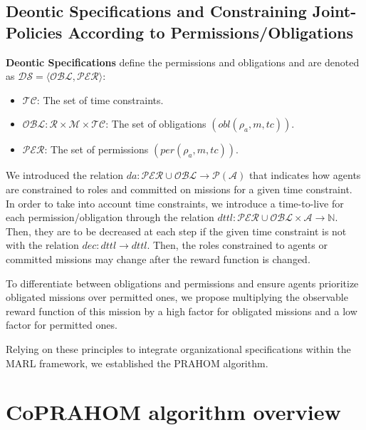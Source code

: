 \documentclass[conference]{IEEEtran}
\newcounter{relation}
\begin{document}
\subsection{Deontic Specifications and Constraining Joint-Policies According to Permissions/Obligations}

\textbf{Deontic Specifications} define the permissions and obligations and are denoted as $\mathcal{DS} = \langle \mathcal{OBL}, \mathcal{PER} \rangle$:

\begin{itemize}
    \item $\mathcal{TC}$: The set of time constraints.
    \item $\mathcal{OBL}: \mathcal{R} \times \mathcal{M} \times \mathcal{TC}$: The set of obligations $(obl(\rho_a, m, tc))$.
    \item $\mathcal{PER}$: The set of permissions $(per(\rho_a, m, tc))$.
\end{itemize}

We introduced the relation $da: \mathcal{PER} \cup \mathcal{OBL} \rightarrow \mathcal{P}(\mathcal{A})$ that indicates how agents are constrained to roles and committed on missions for a given time constraint. In order to take into account time constraints, we introduce a time-to-live for each permission/obligation through the relation $dttl: \mathcal{PER} \cup \mathcal{OBL} \times \mathcal{A} \rightarrow \mathbb{N}$. Then, they are to be decreased at each step if the given time constraint is not  with the relation $dec: dttl \rightarrow dttl$. Then, the roles constrained to agents or committed missions may change after the reward function is changed.

To differentiate between obligations and permissions and ensure agents prioritize obligated missions over permitted ones, we propose multiplying the observable reward function of this mission by a high factor for obligated missions and a low factor for permitted ones.

Relying on these principles to integrate organizational specifications within the MARL framework, we established the PRAHOM algorithm.


\section{CoPRAHOM algorithm overview}\label{sec:prahom_theory}

\end{document}
